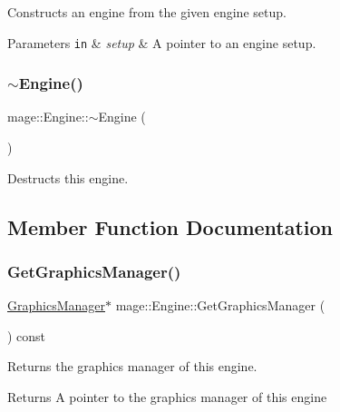 Constructs an engine from the given engine setup.


\begin{DoxyParams}[1]{Parameters}
\mbox{\tt in}  & {\em setup} & A pointer to an engine setup. \\
\hline
\end{DoxyParams}
\hypertarget{classmage_1_1_engine_a34628556f8397d70ed018d71e343c2f5}{}\label{classmage_1_1_engine_a34628556f8397d70ed018d71e343c2f5} 
\subsubsection{\texorpdfstring{$\sim$\+Engine()}{~Engine()}}
{\footnotesize\ttfamily mage\+::\+Engine\+::$\sim$\+Engine (\begin{DoxyParamCaption}{ }\end{DoxyParamCaption})\hspace{0.3cm}{\ttfamily [virtual]}}

Destructs this engine. 

\subsection{Member Function Documentation}
\hypertarget{classmage_1_1_engine_a7dde353835870f5db50143a1576b58e2}{}\label{classmage_1_1_engine_a7dde353835870f5db50143a1576b58e2} 
\subsubsection{\texorpdfstring{Get\+Graphics\+Manager()}{GetGraphicsManager()}}
{\footnotesize\ttfamily \hyperlink{classmage_1_1_graphics_manager}{Graphics\+Manager}$\ast$ mage\+::\+Engine\+::\+Get\+Graphics\+Manager (\begin{DoxyParamCaption}{ }\end{DoxyParamCaption}) const}

Returns the graphics manager of this engine.

\begin{DoxyReturn}{Returns}
A pointer to the graphics manager of this engine 
\end{DoxyReturn}
\hypertarget{classmage_1_1_engine_a55d099d040e8895803f15e214f3b6d9e}{}\label{classmage_1_1_engine_a55d099d040e8895803f15e214f3b6d9e} 
